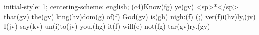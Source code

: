 initial-style: 1;
centering-scheme: english;
(c4)Know(fg) ye(gv) <sp>*</sp> that(gv) the(gv) king(hv)dom(g) of(f) God(gv) is(gh) nigh:(f) (;) ver(f)i(hv)ly,(jv) I(jv) say(kv) un(i)to(jv) you,(hg) it(f) will(e) not(fg) tar(gv)ry.(gv)
